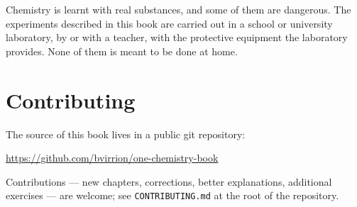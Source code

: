 Chemistry is learnt with real substances, and some of them are dangerous.
The experiments described in this book are carried out in a school or
university laboratory, by or with a teacher, with the protective
equipment the laboratory provides. None of them is meant to be done at
home.

\section*{Contributing}

The source of this book lives in a public git repository:
\begin{center}
\url{https://github.com/bvirrion/one-chemistry-book}
\end{center}
Contributions --- new chapters, corrections, better explanations,
additional exercises --- are welcome; see \texttt{CONTRIBUTING.md} at the
root of the repository.
